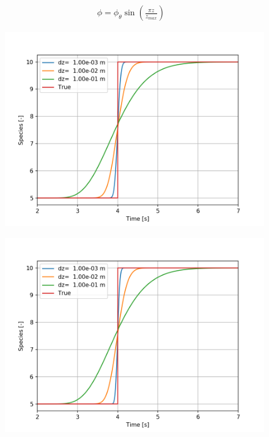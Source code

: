 \begin{align}
   \phi = \phi_{\theta}\sin\left(\frac{\pi z}{z_{max}}\right)
   & \label{eq:variable_neutron_flux}
\end{align}

\vspace{12.7mm} %

\begin{figure}[ht] 
\centering
\begin{minipage}{.5\textwidth}
  \centering
  \includegraphics[width=.9\linewidth]{images/transportSpeciesLateral.png}
  \label{fig:latFlowResults}
\end{minipage}%
\begin{minipage}{.5\textwidth}
  \centering
  \includegraphics[width=.9\linewidth]{images/transportSpeciesConvection.png}
  \label{fig:axial_step_change}
\end{minipage}
\end{figure}

